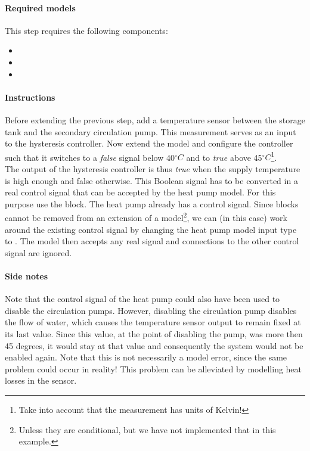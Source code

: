 \documentclass[10pt,a4paper]{article}
\begin{document}
\paragraph{Required models}
This step requires the following components:
\begin{itemize}
\item {}
\item {}
\item {}
\end{itemize}

\paragraph{Instructions}
Before extending the previous step, add a temperature sensor between the storage tank
and the secondary circulation pump.
This measurement serves as an input to the hysteresis controller.
Now extend the model and configure the controller such that it switches to a \textit{false} signal below
40$^{\circ}C$ and to \textit{true} above 45$^{\circ}C$\footnote{Take into account that the measurement has units of Kelvin!}.\\

The output of the hysteresis controller is thus \textit{true} when the supply temperature is 
high enough and false otherwise.
This Boolean signal has to be converted in a real control signal that can be
accepted by the heat pump model.
For this purpose use the  block.
The heat pump already has a control signal. 
Since blocks cannot be removed from an extension of a model\footnote{Unless 
they are conditional, but we have not implemented that in this example.},
we can (in this case) work around the existing control signal
by changing the heat pump model input type to .
The model then accepts any real signal and connections to the other control 
signal are ignored. 

\paragraph{Side notes}
Note that the control signal of the heat pump could also have been used to disable
the circulation pumps.
However, disabling the circulation pump disables the flow of water,
which causes the temperature sensor output to remain fixed at
its last value.
Since this value, at the point of disabling the pump, was more then 45 degrees,
it would stay at that value and consequently the system would not be enabled again.
Note that this is not necessarily a model error, since the same problem could
occur in reality! This problem can be alleviated by modelling
heat losses in the sensor.\\
\end{document}
